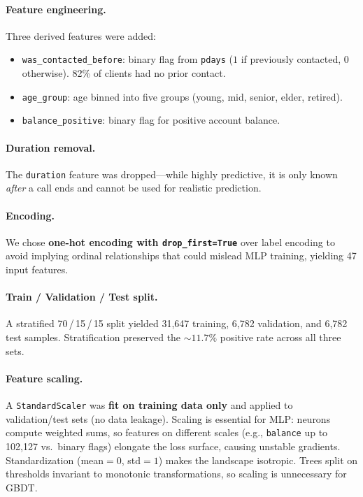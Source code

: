 \documentclass[11pt, a4paper]{article}
\begin{document}
\paragraph{Feature engineering.}
Three derived features were added:
\begin{itemize}[nosep]
    \item \texttt{was\_contacted\_before}: binary flag from \texttt{pdays}
          ($1$ if previously contacted, $0$ otherwise). 82\% of clients had
          no prior contact.
    \item \texttt{age\_group}: age binned into five groups (young, mid, senior,
          elder, retired).
    \item \texttt{balance\_positive}: binary flag for positive account balance.
\end{itemize}

\paragraph{Duration removal.}
The \texttt{duration} feature was dropped---while highly predictive, it is only
known \emph{after} a call ends and cannot be used for realistic prediction.

\paragraph{Encoding.}
We chose \textbf{one-hot encoding with \texttt{drop\_first=True}} over label
encoding to avoid implying ordinal relationships that could mislead MLP
training, yielding 47 input features.

\paragraph{Train / Validation / Test split.}
A stratified 70\,/\,15\,/\,15 split yielded 31,647 training, 6,782 validation,
and 6,782 test samples. Stratification preserved the ${\sim}11.7\%$ positive
rate across all three sets.

\paragraph{Feature scaling.}
A \texttt{StandardScaler} was \textbf{fit on training data only} and applied to
validation/test sets (no data leakage). Scaling is essential for MLP: neurons
compute weighted sums, so features on different scales (e.g., \texttt{balance}
up to 102,127 vs.\ binary flags) elongate the loss surface, causing unstable
gradients. Standardization (mean$=0$, std$=1$) makes the landscape isotropic.
Trees split on thresholds invariant to monotonic transformations, so scaling is
unnecessary for GBDT.
\end{document}
